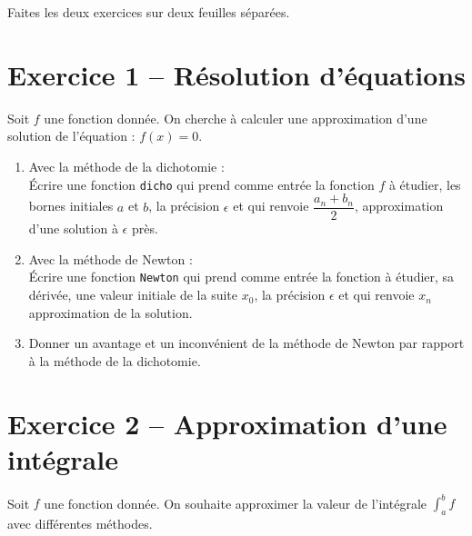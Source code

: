





\begin{center}
{\Large\bf {\type} \no {\num}}
\end{center}


Faites les deux exercices sur deux feuilles séparées.

\section*{Exercice 1 --  Résolution d'équations}
Soit $f$ une fonction donnée. On cherche à calculer une approximation d'une solution de l'équation : $f(x)=0$.
\begin{enumerate}
\item Avec la méthode de la dichotomie : \\
Écrire une fonction \verb?dicho? qui prend comme entr\' ee la fonction $f$ \` a \' etudier, les bornes initiales $a$ et $b$, la pr\' ecision $\epsilon$ et qui renvoie $\dfrac{a_n+b_n}{2}$, approximation d’une solution \` a $\epsilon$ pr\` es.
\item Avec la méthode de Newton :\\
\' Ecrire une fonction \verb?Newton? qui prend comme entr\' ee la fonction \` a \' etudier, sa d\' eriv\' ee, une valeur initiale de la suite $x_0$, la pr\' ecision $\epsilon$ et qui renvoie $x_n$ approximation de la solution.
\item Donner un avantage et un inconvénient de la méthode de Newton par rapport à la méthode de la dichotomie.
\end{enumerate}



\section*{Exercice 2 -- Approximation d'une intégrale}
Soit $f$ une fonction donnée. On souhaite approximer la valeur de l'intégrale $\displaystyle \int_a^b f$ avec différentes méthodes.
